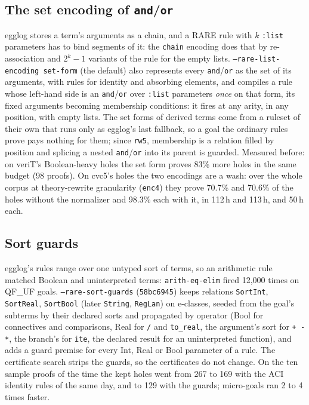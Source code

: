\documentclass[11pt,a4paper]{article}
\newcommand{\UF}{QF\_UF}
\newcommand{\code}[1]{\texttt{#1}}
\begin{document}
\subsection{The set encoding of \code{and}/\code{or}}\label{sec:setform}

egglog stores a term's arguments as a chain, and a RARE rule with $k$
\code{:list} parameters has to bind segments of it: the \code{chain}
encoding does that by re-association and $2^k-1$ variants of the rule for
the empty lists. \code{--rare-list-encoding set-form} (the default) also
represents every \code{and}/\code{or} as the set of its arguments, with
rules for identity and absorbing elements, and compiles a rule whose
left-hand side is an \code{and}/\code{or} over \code{:list} parameters
\emph{once} on that form, its fixed arguments becoming membership
conditions: it fires at any arity, in any position, with empty lists. The
set forms of derived terms come from a ruleset of their own that runs only
as egglog's last fallback, so a goal the ordinary rules prove pays nothing
for them; since \code{rw5}, membership is a relation filled by position and
splicing a nested \code{and}/\code{or} into its parent is guarded. Measured
before: on veriT's Boolean-heavy holes the set form proves 83\% more holes in
the same budget (98 proofs). On cvc5's holes the two encodings are a wash:
over the whole corpus at theory-rewrite granularity (\code{enc4}) they prove
70.7\% and 70.6\% of the holes without the normalizer and 98.3\% each with
it, in 112\,h and 113\,h, and 50\,h each.

\subsection{Sort guards}\label{sec:guards}

egglog's rules range over one untyped sort of terms, so an arithmetic rule
matched Boolean and uninterpreted terms: \code{arith-eq-elim} fired 12,000
times on \UF{} goals. \code{--rare-sort-guards} (\code{58bc6945}) keeps
relations \code{SortInt}, \code{SortReal}, \code{SortBool} (later
\code{String}, \code{RegLan}) on e-classes, seeded from the goal's subterms
by their declared sorts and propagated by operator (Bool for connectives
and comparisons, Real for \code{/} and \code{to\_real}, the argument's sort
for \code{+ - *}, the branch's for \code{ite}, the declared result for an
uninterpreted function), and adds a guard premise for every Int, Real or
Bool parameter of a rule. The certificate search strips the guards, so the
certificates do not change. On the ten sample proofs of the time the kept
holes went from 267 to 169 with the ACI identity rules of the same day, and
to 129 with the guards; micro-goals ran 2 to 4 times faster.
\end{document}

